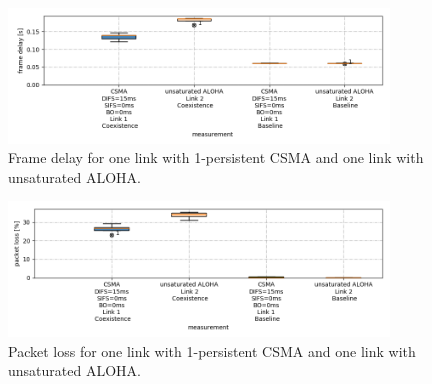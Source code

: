 \begin{figure}[tb]
	\label{fig:results-difs-only-aloha-frame-delay}
	\begin{center}
		\includegraphics[width=0.9\textwidth]{pictures/results/different_combinations/difs_only_aloha/frame_delay_boxplot}	
	\end{center}
	\caption{Frame delay for one link with 1-persistent CSMA and one link with unsaturated ALOHA.}
\end{figure}

\begin{figure}[bt]
	\label{fig:results-difs-only-aloha-packet-loss}
	\begin{center}
		\includegraphics[width=0.9\textwidth]{pictures/results/different_combinations/difs_only_aloha/packet_loss_boxplot}		
	\end{center}
	\caption{Packet loss for one link with 1-persistent CSMA and one link with unsaturated ALOHA.}
\end{figure}

